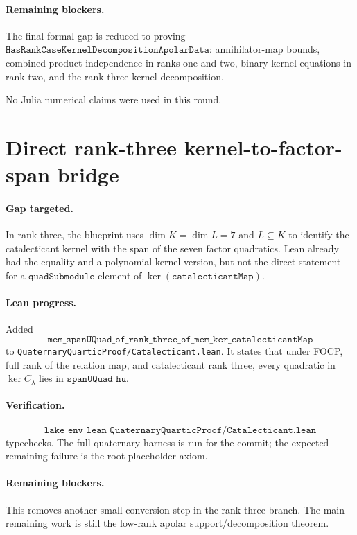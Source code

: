 \documentclass[11pt]{article}
\begin{document}
\paragraph{Remaining blockers.}
The final formal gap is reduced to proving
\(\texttt{HasRankCaseKernelDecompositionApolarData}\): annihilator-map bounds,
combined product independence in ranks one and two, binary kernel equations in
rank two, and the rank-three kernel decomposition.

No Julia numerical claims were used in this round.

\section*{Direct rank-three kernel-to-factor-span bridge}

\paragraph{Gap targeted.}
In rank three, the blueprint uses \(\dim K=\dim L=7\) and \(L\subseteq K\) to
identify the catalecticant kernel with the span of the seven factor quadratics.
Lean already had the equality and a polynomial-kernel version, but not the
direct statement for a \(\texttt{quadSubmodule}\) element of
\(\ker(\texttt{catalecticantMap})\).

\paragraph{Lean progress.}
Added
\[
\texttt{mem\_spanUQuad\_of\_rank\_three\_of\_mem\_ker\_catalecticantMap}
\]
to \texttt{QuaternaryQuarticProof/Catalecticant.lean}.  It states that under
FOCP, full rank of the relation map, and catalecticant rank three, every
quadratic in \(\ker C_\lambda\) lies in \(\texttt{spanUQuad hu}\).

\paragraph{Verification.}
\[
\texttt{lake env lean QuaternaryQuarticProof/Catalecticant.lean}
\]
typechecks.  The full quaternary harness is run for the commit; the expected
remaining failure is the root placeholder axiom.

\paragraph{Remaining blockers.}
This removes another small conversion step in the rank-three branch.  The main
remaining work is still the low-rank apolar support/decomposition theorem.
\end{document}
